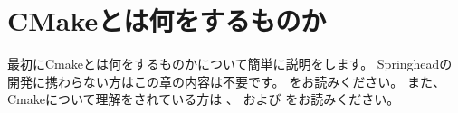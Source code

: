 \newpage
\section{CMakeとは何をするものか}
\label{sec:WhatCMakeWillDo}

\def\Anno#1{\mc{\footnotesize{ \CDots\  #1}}}
\def\SolutionFile{\hbox{ソリューションファイル
	{\raise 1.2ex\hbox{\scriptsize (}}%
	\raise.3ex\hbox{\small{$^\dagger$}}%
	{\raise 1.2ex\hbox{\scriptsize )}}%
}}
\def\ProjectFile{\hbox{プロジェクトファイル
	{\raise 1.2ex\hbox{\scriptsize (}}%
	\raise.4ex\hbox{\small{$^\ddagger$}}%
	{\raise 1.2ex\hbox{\scriptsize )}}%
}}
\def\cmake{\tt{cmake}}
\def\make{\tt{make}}
\def\SprLib{Springheadライブラリ}
\def\SprProj{Springheadプロジェクト}
\def\VS{Visual Studio}

\def\SprTop#1{\Path{C:/Springhead{#1}}}
\def\AppTop#1{\Path{C:/Develop/Application{#1}}}
\def\build{{\it{build\/}}}

\def\CMakeLists#1{\Path{CMakeLists.txt#1}}
\def\CMakeOpts#1{\Path{CMakeOpts.txt#1}}
\def\CMakeConf#1{\Path{CMakeConf.txt#1}}
\def\CMakeTopdir#1{\Path{CMakeTopdir.txt#1}}

\def\thinrule#1{\makebox[#1][l]{\vrule width #1 height 0.1pt}}


\noindent
最初にCmakeとは何をするものかについて簡単に説明をします。
Springheadの開発に携わらない方はこの章の内容は不要です。
をお読みください。
また、Cmakeについて理解をされている方は
、
および
をお読みください。

